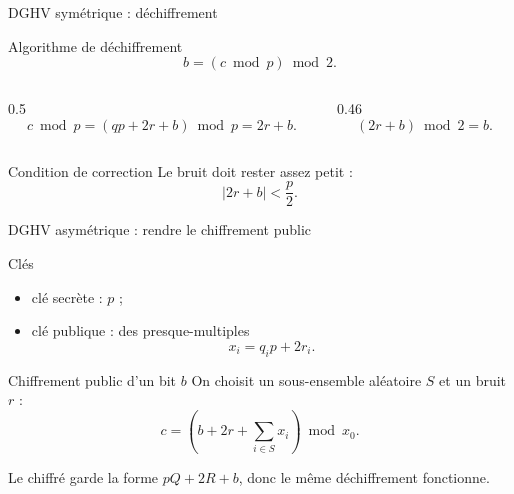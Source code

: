 \documentclass[10pt,aspectratio=169]{beamer}
\begin{document}
\begin{frame}{DGHV symétrique : déchiffrement}
  \begin{block}{Algorithme de déchiffrement}
    \[
      b=(c\bmod p)\bmod 2.
    \]
  \end{block}

  \begin{columns}[T,onlytextwidth]
    \begin{column}{0.5\textwidth}
      \[
        c\bmod p
        =
        (qp+2r+b)\bmod p
        =
        2r+b.
      \]
    \end{column}
    \begin{column}{0.46\textwidth}
      \[
        (2r+b)\bmod 2=b.
      \]
    \end{column}
  \end{columns}

  \begin{exampleblock}{Condition de correction}
    Le bruit doit rester assez petit :
    \[
      |2r+b|<\frac{p}{2}.
    \]
  \end{exampleblock}
\end{frame}

\begin{frame}{DGHV asymétrique : rendre le chiffrement public}
  \begin{block}{Clés}
    \begin{itemize}
      \item clé secrète : $p$ ;
      \item clé publique : des presque-multiples
      \[
        x_i=q_ip+2r_i.
      \]
    \end{itemize}
  \end{block}

  \begin{block}{Chiffrement public d'un bit $b$}
    On choisit un sous-ensemble aléatoire $S$ et un bruit $r$ :
    \[
      c=\left(b+2r+\sum_{i\in S}x_i\right)\bmod x_0.
    \]
  \end{block}

  Le chiffré garde la forme $pQ+2R+b$, donc le même déchiffrement fonctionne.
\end{frame}

\end{document}
